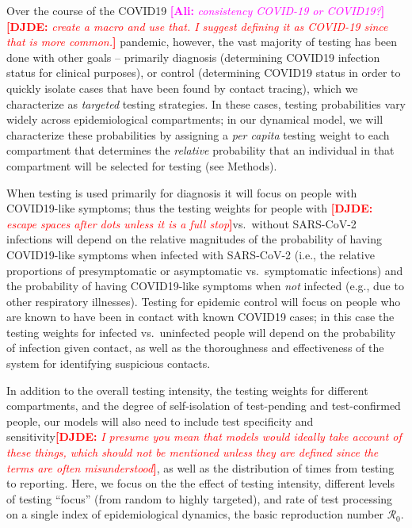 \documentclass[12pt]{article}
\newcommand{\percap}{\emph{per capita}\xspace}
\newcommand{\Rnum}{\mathcal{R}_0}
\newcommand{\comment}{\showcomment}
\newcommand{\showcomment}[3]{\textcolor{#1}{\textbf{[#2: }\textsl{#3}\textbf{]}}}
\newcommand{\ali}[1]{\comment{magenta}{Ali}{#1}}
\newcommand{\david}[1]{\comment{red}{DJDE}{#1}}
\theoremstyle{definition} %
\begin{document}
Over the course of the COVID19 \ali{consistency COVID-19 or COVID19?}\david{create a \texttt{\detokenize{\covid}} macro and use that.  I suggest defining it as COVID-19 since that is more common.} pandemic, however, the vast majority of testing has been done with other goals --
primarily diagnosis (determining COVID19 infection status for clinical purposes), or control (determining COVID19 status in order to quickly isolate cases that have been found by contact tracing), which we characterize as \emph{targeted} testing strategies.
In these cases, testing probabilities vary widely across epidemiological compartments; in our dynamical model, we will characterize these probabilities by assigning a \percap testing weight to each compartment that determines the \emph{relative} probability that an individual in that compartment will be selected for testing (see Methods). 

When testing is used primarily for diagnosis it will focus on people with COVID19-like symptoms; thus the testing weights for people with \david{escape spaces after dots unless it is a full stop}vs.\ without SARS-CoV-2 infections will depend on the relative magnitudes of the probability of having COVID19-like symptoms when infected with SARS-CoV-2 (i.e., the relative proportions of presymptomatic or asymptomatic vs.\ symptomatic infections) and the probability of having COVID19-like symptoms when \emph{not} infected (e.g., due to other respiratory illnesses). Testing for epidemic control will focus on people who are known to have been in contact with known COVID19 cases; in this case the testing weights for infected vs.\ uninfected people will depend on the probability of infection given contact, as well as the thoroughness and effectiveness of the system for identifying suspicious contacts.

In addition to the overall testing intensity, the testing weights for different compartments, and the degree of self-isolation of test-pending and test-confirmed people, our models will also need to include test specificity and sensitivity\david{I presume you mean that models would ideally take account of these things, which should not be mentioned unless they are defined since the terms are often misunderstood}, as well as the distribution of times from testing to reporting. 
Here, we focus on the the effect of testing intensity, different levels of testing ``focus'' (from random to highly targeted), and rate of test processing on a single index of epidemiological dynamics, the basic reproduction number $\Rnum$.
\end{document}

